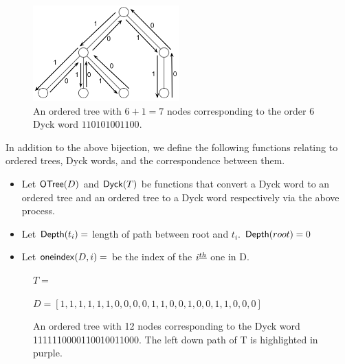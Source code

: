 \begin{figure}[H]
    \centering
    \includegraphics[width=0.5\textwidth]{otreebij.png}
    \caption{An ordered tree with $6+1=7$ nodes corresponding to the order 6 Dyck word $110101001100$.}
    \label{ordered_tree_bijection_illustration}
\end{figure}


In addition to the above bijection, we define the following functions relating to ordered trees, Dyck words, and the correspondence between them.

\begin{itemize}
    \item Let $\mathsf{OTree}{(D)}$ and $\mathsf{Dyck}{(T)}$ be functions that convert a Dyck word to an ordered tree and an ordered tree to a Dyck word respectively via the above process.
    \item Let $\mathsf{Depth}{(t_i)}=$ length of path between root and $t_i$. $\mathsf{Depth}{(root)}=0$
    \item Let $\mathsf{oneindex}({D}, i)=$ be the index of the $i^{\underline{th}}{}$ one in D.
\end{itemize}

\bigskip

\begin{figure}
    \centering
    $T=$


    $D=[1, 1, 1, 1, 1, 1, 0, 0, 0, 0, 1, 1, 0, 0, 1, 0, 0, 1, 1, 0, 0, 0]$
    \caption{An ordered tree with 12 nodes corresponding to the Dyck word 1111110000110010011000.  The left down path of T is highlighted in purple. }
    \label{exampleotree}
\end{figure}

